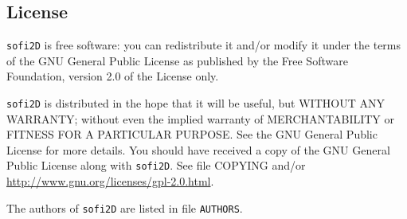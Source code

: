\documentclass[11pt,english,a4paper]{article}
\begin{document}
\subsection{License}
\label{license}
\texttt{sofi2D} is free software: you can redistribute it and/or modify it under the terms of the GNU General Public License as published by the Free Software Foundation, version 2.0 of the License only.
 
\texttt{sofi2D} is distributed in the hope that it will be useful, but WITHOUT ANY WARRANTY; without even the implied warranty of MERCHANTABILITY or FITNESS FOR A PARTICULAR PURPOSE. See the GNU General Public License for more details. You should have received a copy of the GNU General Public License along with \texttt{sofi2D}. See file COPYING and/or \url{http://www.gnu.org/licenses/gpl-2.0.html}.

The authors of \texttt{sofi2D} are listed in file \texttt{AUTHORS}.





\printbibliography   

\appendix


\end{document}
